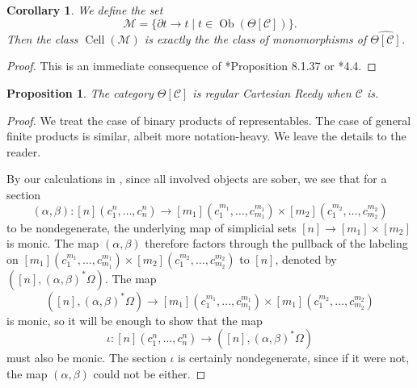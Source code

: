 \documentclass[leqno]{article}
\numberwithin{equation}{subsection}
\theoremstyle{plain}   %
\newtheorem{prop}[equation]{Proposition}
\newtheorem{cor}[equation]{Corollary}
\theoremstyle{remark}
\theoremstyle{plain}
\DeclareMathOperator{\Ob}{Ob}
\providecommand{\C}{}
\renewcommand{\C}{\ensuremath{\mathcal{C}}}
\newcommand{\cellset}{\ensuremath{\widehat{\Theta[\mathcal{C}]}}}
\begin{document}
\begin{cor} 
	We define the set
	\[\mathscr{M}=\{\partial t \to t \mid t \in \Ob(\Theta[\C])\}.\]  Then the class \(\operatorname{Cell}(\mathscr{M})\) is exactly the the class of monomorphisms of \(\cellset\).  
\end{cor}
\begin{proof}
	This is an immediate consequence of \cite{cisinski-book}*{Proposition 8.1.37} or \cite{bergner-rezk-reedy}*{4.4}.
\end{proof}
\begin{prop}
	The category \(\Theta[\C]\) is regular Cartesian Reedy when \(\C\) is.
\end{prop}
\begin{proof}
	We treat the case of binary products of representables.  The case of general finite products is similar, albeit more notation-heavy. We leave the details to the reader.

	By our calculations in , since all involved objects are sober, we see that for a section 
	\[
		(\alpha,\beta):[n](c^n_1,\dots,c^n_n) \to [m_1](c^{m_1}_1,\dots,c^{m_1}_{m_1})\times [m_2](c^{m_2}_1,\dots,c^{m_2}_{m_2})
	\]
	to be nondegenerate, the underlying map of simplicial sets \([n]\to [m_1]\times [m_2]\) is monic. The map \((\alpha,\beta)\) therefore factors through the pullback of the labeling on \([m_1](c^{m_1}_1,\dots,c^{m_1}_{m_1})\times [m_2](c^{m_2}_1,\dots,c^{m_2}_{m_2})\) to \([n]\), denoted by \(([n],(\alpha,\beta)^\ast \Omega)\).  The map  
	\[
		([n],(\alpha,\beta)^\ast \Omega) \to [m_1](c^{m_1}_1,\dots,c^{m_1}_{m_1})\times [m_1](c^{m_2}_1,\dots,c^{m_2}_{m_2})
	\]
	is monic, so it will be enough to show that the map
	\[
		\iota:[n](c^n_1,\dots,c^n_n)\to ([n],(\alpha,\beta)^\ast \Omega)
	\]
	must also be monic.  The section \(\iota\) is certainly nondegenerate, since if it were not, the map \((\alpha,\beta)\) could not be either.
	

\end{proof}
\end{document}
